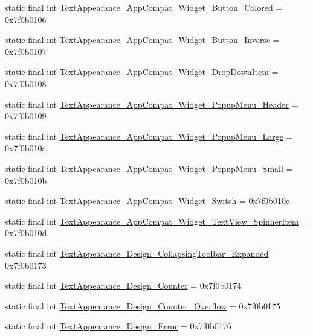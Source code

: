 \begin{CompactItemize}
static final int \hyperlink{classandroid_1_1support_1_1v4_1_1_r_1_1style_4d3293fdea933c2fb0def95b229ed521}{TextAppearance\_\-AppCompat\_\-Widget\_\-Button\_\-Colored} = 0x7f0b0106
\item 
static final int \hyperlink{classandroid_1_1support_1_1v4_1_1_r_1_1style_238847f0f02acf24b0f09467f8c2d7e3}{TextAppearance\_\-AppCompat\_\-Widget\_\-Button\_\-Inverse} = 0x7f0b0107
\item 
static final int \hyperlink{classandroid_1_1support_1_1v4_1_1_r_1_1style_8668158633a4dc9cfb56fbba5484d552}{TextAppearance\_\-AppCompat\_\-Widget\_\-DropDownItem} = 0x7f0b0108
\item 
static final int \hyperlink{classandroid_1_1support_1_1v4_1_1_r_1_1style_fcd0237acb05c40fa386d618e625d3e1}{TextAppearance\_\-AppCompat\_\-Widget\_\-PopupMenu\_\-Header} = 0x7f0b0109
\item 
static final int \hyperlink{classandroid_1_1support_1_1v4_1_1_r_1_1style_6c025fe16caaada4feb80cb666d189d3}{TextAppearance\_\-AppCompat\_\-Widget\_\-PopupMenu\_\-Large} = 0x7f0b010a
\item 
static final int \hyperlink{classandroid_1_1support_1_1v4_1_1_r_1_1style_5359a1425affed085e0954424c4969fa}{TextAppearance\_\-AppCompat\_\-Widget\_\-PopupMenu\_\-Small} = 0x7f0b010b
\item 
static final int \hyperlink{classandroid_1_1support_1_1v4_1_1_r_1_1style_dc977b46ce8f25de8ad71b445780d91e}{TextAppearance\_\-AppCompat\_\-Widget\_\-Switch} = 0x7f0b010c
\item 
static final int \hyperlink{classandroid_1_1support_1_1v4_1_1_r_1_1style_69f8b26ecd40417f972050ad0b869c56}{TextAppearance\_\-AppCompat\_\-Widget\_\-TextView\_\-SpinnerItem} = 0x7f0b010d
\item 
static final int \hyperlink{classandroid_1_1support_1_1v4_1_1_r_1_1style_40fed871f24e5b2479f274421dab4482}{TextAppearance\_\-Design\_\-CollapsingToolbar\_\-Expanded} = 0x7f0b0173
\item 
static final int \hyperlink{classandroid_1_1support_1_1v4_1_1_r_1_1style_19be77ac8f8a32106f66e1dc5d5b6adb}{TextAppearance\_\-Design\_\-Counter} = 0x7f0b0174
\item 
static final int \hyperlink{classandroid_1_1support_1_1v4_1_1_r_1_1style_b23ec54954d27cfeb50e7785a72728fa}{TextAppearance\_\-Design\_\-Counter\_\-Overflow} = 0x7f0b0175
\item 
static final int \hyperlink{classandroid_1_1support_1_1v4_1_1_r_1_1style_0f1a14e04b74d1497e111328e838568a}{TextAppearance\_\-Design\_\-Error} = 0x7f0b0176

\end{CompactItemize}
